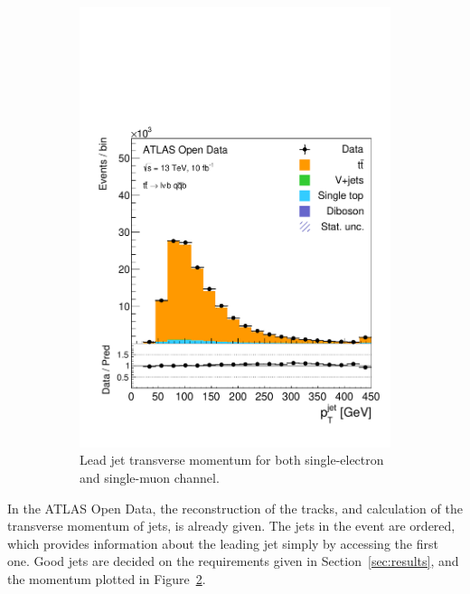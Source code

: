 \documentclass[12pt,a4paper]{article}
\numberwithin{equation}{section}
\begin{document}
\begin{figure}[t!]
\begin{subfigure}[t]{0.47\textwidth}
    \includegraphics[width=1.0\textwidth]{figures/hist_leadjet_pt}
    \caption{\label{fig:jetpt}Lead jet transverse momentum for both
      single-electron and single-muon channel.}
  \end{subfigure}
  \caption{}
\end{figure}

In the ATLAS Open Data, the reconstruction of the tracks, and calculation of the
transverse momentum of jets, is already given. The jets in the event are
ordered, which provides information about the leading jet simply by accessing
the first one. Good jets are decided on the requirements given in
Section~\ref{sec:results}, and the momentum plotted in
Figure~\ref{fig:jetpt}. \\%
\end{document}
